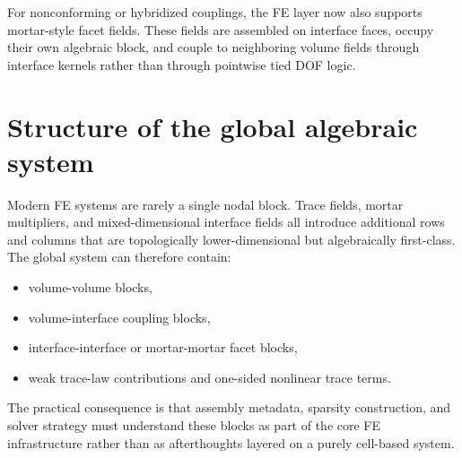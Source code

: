 For nonconforming or hybridized couplings, the FE layer now also supports
mortar-style facet fields. These fields are assembled on interface faces,
occupy their own algebraic block, and couple to neighboring volume fields
through interface kernels rather than through pointwise tied DOF logic.

\section{Structure of the global algebraic system}
\label{sec:assembly:global_system}

Modern FE systems are rarely a single nodal block. Trace fields, mortar
multipliers, and mixed-dimensional interface fields all introduce additional
rows and columns that are topologically lower-dimensional but algebraically
first-class. The global system can therefore contain:

\begin{itemize}
\item volume-volume blocks,
\item volume-interface coupling blocks,
\item interface-interface or mortar-mortar facet blocks,
\item weak trace-law contributions and one-sided nonlinear trace terms.
\end{itemize}

The practical consequence is that assembly metadata, sparsity construction, and
solver strategy must understand these blocks as part of the core FE
infrastructure rather than as afterthoughts layered on a purely cell-based
system.
